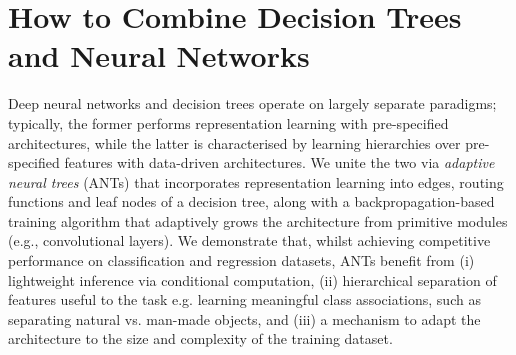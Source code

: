%
%
\chapter{How to Combine Decision Trees and Neural Networks}
\label{chapter:ant}
Deep neural networks and decision trees operate on largely separate paradigms; typically, the former performs representation learning with pre-specified architectures, while the latter is characterised by learning hierarchies over pre-specified features with data-driven architectures. We unite the two via \emph{adaptive neural trees} (ANTs) that incorporates representation learning into edges, routing functions and leaf nodes of a decision tree, along with a backpropagation-based training algorithm that adaptively grows the architecture from primitive modules (e.g., convolutional layers). We demonstrate that, whilst achieving competitive performance on classification and regression datasets, ANTs benefit from (i) lightweight inference via conditional computation, (ii) hierarchical separation of features useful to the task e.g. learning meaningful class associations, such as separating natural vs. man-made objects, and (iii) a mechanism to adapt the architecture to the size and complexity of the training dataset.

%





%

%
%

% 